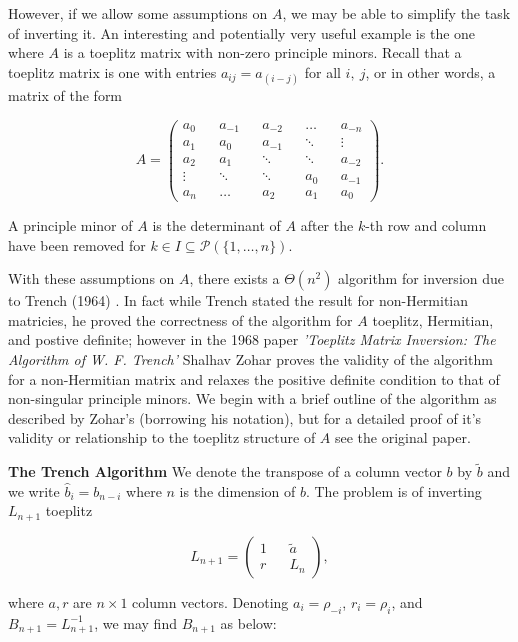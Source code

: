 \documentclass{article}
\begin{document}
However, if we allow some assumptions on $A$, we may be able to simplify the task of inverting it. An interesting and potentially very useful example is the one where $A$ is a toeplitz matrix with non-zero principle minors. Recall that a toeplitz matrix is one with entries $ a_{ij} = a_{(i-j)}$ for all $i, \: j$, or in other words, a matrix of the form

$$ A = \begin{pmatrix} a_0 && a_{-1} && a_{-2} && \ldots && a_{-n} \\
a_{1} && a_0 && a_{-1} && \ddots && \vdots \\
a_{2} && a_{1} && \ddots && \ddots && a_{-2} \\
\vdots && \ddots  && \ddots && a_{0} && a_{-1} \\
a_{n} && \ldots && a_{2} && a_1 && a_0
\end{pmatrix}.$$

A principle minor of $A$ is the determinant of $A$ after the $k$-th row and column have been removed for $k \in I \subseteq \mathcal{P}\left(\{1, \ldots, n\} \right)$.

With these assumptions on $A$, there exists a $\Theta(n^2)$ algorithm for inversion due to Trench (1964) \autocite{Trench}. In fact while Trench stated the result for non-Hermitian matricies, he proved the correctness of the algorithm for $A$ toeplitz, Hermitian, and postive definite; however in the 1968 paper \textit{'Toeplitz Matrix Inversion: The Algorithm of W. F. Trench'} Shalhav Zohar proves the validity of the algorithm for a non-Hermitian matrix and relaxes the positive definite condition to that of non-singular principle minors. \autocite{Zohar} We begin with a brief outline of the algorithm as described by Zohar's (borrowing his notation), but for a detailed proof of it's validity or relationship to the toeplitz structure of $A$ see the original paper.

\textbf{The Trench Algorithm}
We denote the transpose of a column vector $b$ by $\tilde{b}$ and we write $\hat{b}_i = b_{n-i}$ where $n$ is the dimension of $b$. The problem is of inverting $L_{n+1}$ toeplitz

$$ L_{n+1} = \begin{pmatrix} 1 && \tilde{a} \\
 r && L_n \end{pmatrix},$$

 where $a, r$ are $n \times 1$ column vectors. Denoting $a_i = \rho_{-i}$, $r_i = \rho_i$, and $B_{n+1} = L_{n+1}^{-1}$, we may find $B_{n+1}$ as below:
\end{document}
